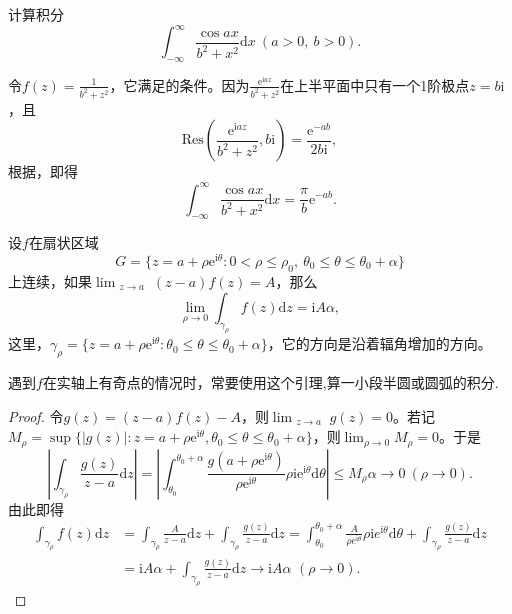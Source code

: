 \documentclass[../../main.tex]{subfiles}%
\begin{document}
\begin{example}
计算积分
\[
\int_{-\infty}^{\infty} \frac{\cos ax}{b^2 + x^2} \mathrm{d}x \ (a > 0, \ b > 0).
\]
\end{example}
\begin{solution}
令\( f(z) = \frac{1}{b^2 + z^2} \)，它满足的条件。因为\( \frac{\mathrm{e}^{\mathrm{i}az}}{b^2 + z^2} \)在上半平面中只有一个1阶极点\( z = b\mathrm{i} \)，且
\[
\mathrm{Res}\left( \frac{\mathrm{e}^{\mathrm{i}az}}{b^2 + z^2}, b\mathrm{i} \right) = \frac{\mathrm{e}^{-ab}}{2b\mathrm{i}},
\]
根据，即得
\[
\int_{-\infty}^{\infty} \frac{\cos ax}{b^2 + x^2} \mathrm{d}x = \frac{\pi}{b} \mathrm{e}^{-ab}.
\]

\end{solution}

\begin{lemma}\label{lemma:引理5.5.9}
设$f$在扇状区域
\[
G = \{ z = a + \rho \mathrm{e}^{\mathrm{i}\theta} : 0 < \rho \leqslant \rho_0, \ \theta_0 \leqslant \theta \leqslant \theta_0 + \alpha \}
\]
上连续，如果\(\lim_{\substack{z \to a}} (z - a)f(z) = A\)，那么
\[
\lim_{\rho \to 0} \int_{\gamma_{\rho}} f(z) \mathrm{d}z = \mathrm{i}A\alpha, \label{lem5.5.9_eq}
\]
这里，\(\gamma_{\rho} = \{ z = a + \rho \mathrm{e}^{\mathrm{i}\theta} : \theta_0 \leqslant \theta \leqslant \theta_0 + \alpha \}\)，它的方向是沿着辐角增加的方向。
\end{lemma}
\begin{remark}
遇到$f$在实轴上有奇点的情况时，常要使用这个引理,算一小段半圆或圆弧的积分.
\end{remark}
\begin{proof}
令\( g(z) = (z - a)f(z) - A \)，则\(\lim_{\substack{z \to a}} g(z) = 0\)。若记\( M_{\rho} = \sup\{ |g(z)| : z = a + \rho \mathrm{e}^{\mathrm{i}\theta}, \theta_0 \leqslant \theta \leqslant \theta_0 + \alpha \} \)，则\(\lim_{\rho \to 0} M_{\rho} = 0\)。于是
\[
\left| \int_{\gamma_{\rho}} \frac{g(z)}{z - a} \mathrm{d}z \right| = \left| \int_{\theta_0}^{\theta_0 + \alpha} \frac{g(a + \rho \mathrm{e}^{\mathrm{i}\theta})}{\rho \mathrm{e}^{\mathrm{i}\theta}} \rho \mathrm{i}\mathrm{e}^{\mathrm{i}\theta} \mathrm{d}\theta \right|
\leqslant M_{\rho}\alpha
\to 0 \ (\rho \to 0).
\]
由此即得
\begin{align*}
\int_{\gamma _{\rho}}{f(z)\mathrm{d}z}&=\int_{\gamma _{\rho}}{\frac{A}{z-a}\mathrm{d}z}+\int_{\gamma _{\rho}}{\frac{g(z)}{z-a}\mathrm{d}z}=\int_{\theta _0}^{\theta _0+\alpha}{\frac{A}{\rho e^{\mathrm{i}\theta}}\rho \mathrm{i}e^{\mathrm{i}\theta}\mathrm{d}\theta}+\int_{\gamma _{\rho}}{\frac{g(z)}{z-a}\mathrm{d}z}
\\
&=\mathrm{i}A\alpha +\int_{\gamma _{\rho}}{\frac{g(z)}{z-a}\mathrm{d}z}\rightarrow \mathrm{i}A\alpha \,\,(\rho \rightarrow 0).
\end{align*}
\end{proof}
\end{document}
